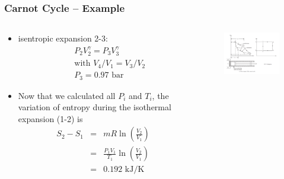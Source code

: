 \documentclass[10pt,compress]{beamer}
\begin{document}
\begin{frame}
 \frametitle{Carnot Cycle -- Example}
  \begin{columns}
   \begin{column}[c]{0.4\linewidth}
    \begin{itemize}
     \item <1-> isentropic expansion 2-3:
      \begin{eqnarray}
       && P_{2}V_{2}^{\gamma}=P_{3}V_{3}^{\gamma}\nonumber \\
       && \text{with } V_{4}/V_{1} = V_{3}/V_{2}\nonumber \\
       && P_{3}=0.97\text{ bar}\nonumber
      \end{eqnarray}
     \item <2-> Now that we calculated all $P_{i}$ and $T_{i}$, the variation of entropy during the isothermal expansion (1-2) is
       \begin{eqnarray}
         S_{2}-S_{1} &=& mR\ln\left(\displaystyle\frac{V_{2}}{V_{1}}\right)\nonumber \\
                     &=& \displaystyle\frac{P_{1}V_{1}}{T_{1}}\ln\left(\displaystyle\frac{V_{2}}{V_{1}}\right) \nonumber \\
                     &=& 0.192\text{ kJ/K} \nonumber
       \end{eqnarray}
    
       
    \end{itemize}
    \end{column}
    \begin{column}[c]{0.6\linewidth}
     \begin{figure}%
      \begin{center}
     \includegraphics[width=7.5cm,clip]{./Pics/GasCycle_CarnotCycle}
    \end{center}
   \end{figure}  
  \end{column}  
 \end{columns}
\end{frame}
\end{document}
